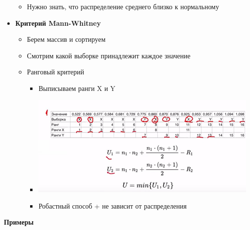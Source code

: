 \documentclass[a4paper, 12pt]{article}
\begin{document}
\begin{itemize}
\begin{itemize}
  \item
    
    Нужно знать, что распределение среднего близко к нормальному
    
  \end{itemize}
\item
  
  \textbf{Критерий Mann-Whitney}
  

  \begin{itemize}
  \item
    
    Берем массив и сортируем
    
  \item
    
    Смотрим какой выборке принадлежит каждое значение
    
  \item
    
    Ранговый критерий
    

    \begin{itemize}
    \item
      
      Выписываем ранги X и Y
      
    \item
      
      \includegraphics[width=4.45833in,height=1.97270in]{media/image14.png}
      
    \item
      
      {Робастный способ + не зависит от распределения}
      
    \end{itemize}
  \end{itemize}
\end{itemize}

\textbf{{Примеры}}
\end{document}
